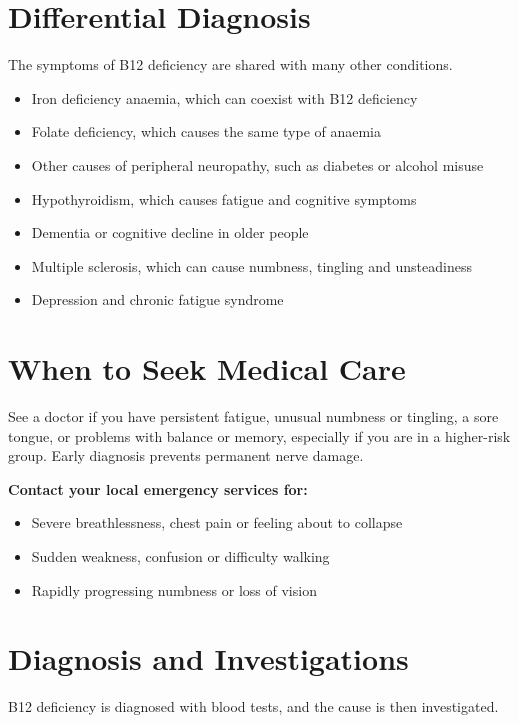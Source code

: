 \section*{Differential Diagnosis}
The symptoms of B12 deficiency are shared with many other conditions.

\begin{itemize}
    \item Iron deficiency anaemia, which can coexist with B12 deficiency
    \item Folate deficiency, which causes the same type of anaemia
    \item Other causes of peripheral neuropathy, such as diabetes or alcohol misuse
    \item Hypothyroidism, which causes fatigue and cognitive symptoms
    \item Dementia or cognitive decline in older people
    \item Multiple sclerosis, which can cause numbness, tingling and unsteadiness
    \item Depression and chronic fatigue syndrome
\end{itemize}

\section*{When to Seek Medical Care}
See a doctor if you have persistent fatigue, unusual numbness or tingling, a sore tongue, or problems with balance or memory, especially if you are in a higher-risk group. Early diagnosis prevents permanent nerve damage.

\textbf{Contact your local emergency services for:}
\begin{itemize}
    \item Severe breathlessness, chest pain or feeling about to collapse
    \item Sudden weakness, confusion or difficulty walking
    \item Rapidly progressing numbness or loss of vision
\end{itemize}

\section*{Diagnosis and Investigations}
B12 deficiency is diagnosed with blood tests, and the cause is then investigated.

